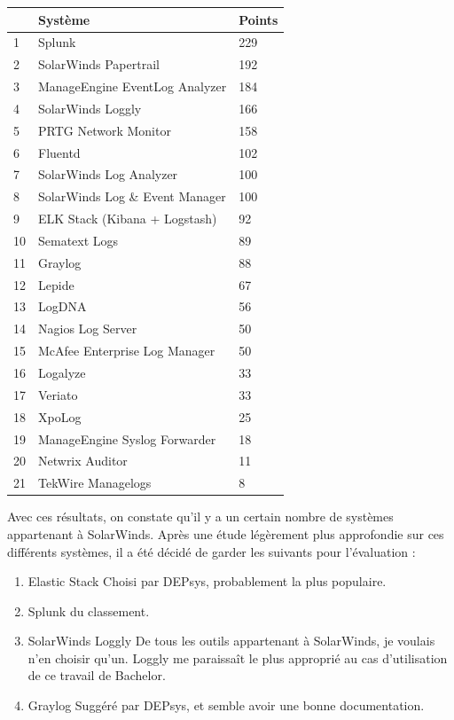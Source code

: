 \documentclass[paper=a4, fontsize=11pt]{scrartcl}
\begin{document}
\centering
\begin{tabular}{ |p{2cm}|p{6cm}|p{1cm}| } 
    \hline
     & Système & Points\\
    \hline
    1 & Splunk & 229\\
    2 & SolarWinds Papertrail & 192\\
    3 & ManageEngine EventLog Analyzer & 184\\
    4 & SolarWinds Loggly & 166\\
    5 & PRTG Network Monitor & 158\\
    6 & Fluentd & 102\\
    7 & SolarWinds Log Analyzer & 100\\
    8 & SolarWinds Log \& Event Manager & 100\\
    9 & ELK Stack (Kibana + Logstash)  & 92\\
    10 & Sematext Logs & 89\\
    11 & Graylog & 88\\
    12 & Lepide & 67\\
    13 & LogDNA & 56\\
    14 & Nagios Log Server & 50\\
    15 & McAfee Enterprise Log Manager & 50\\
    16 & Logalyze & 33\\
    17 & Veriato & 33\\
    18 & XpoLog & 25\\
    19 & ManageEngine Syslog Forwarder & 18\\
    20 & Netwrix Auditor & 11\\
    21 & TekWire Managelogs & 8\\
    \hline
\end{tabular}

\justify

Avec ces résultats, on constate qu'il y a un certain nombre de systèmes appartenant à SolarWinds. Après une étude légèrement plus approfondie sur ces différents systèmes, il a été décidé de garder les suivants pour l'évaluation :

\begin{enumerate}
    \item Elastic Stack
    \subitem Choisi par DEPsys, probablement la plus populaire.
    \item Splunk
     du classement.
    \item SolarWinds Loggly
    \subitem De tous les outils appartenant à SolarWinds, je voulais n'en choisir qu'un. Loggly me paraissaît le plus approprié au cas d'utilisation de ce travail de Bachelor.
    \item Graylog
    \subitem Suggéré par DEPsys, et semble avoir une bonne documentation.
\end{enumerate}
\end{document}
